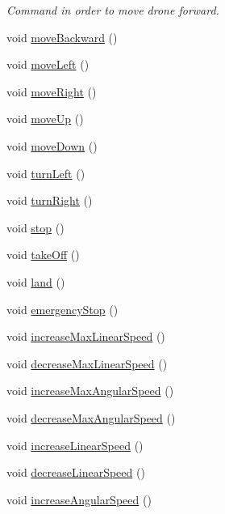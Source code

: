 \begin{DoxyCompactItemize}
\begin{DoxyCompactList}\small\item\em \-Command in order to move drone forward. \end{DoxyCompactList}\item 
void \hyperlink{classNymeria_a7781b8726f7a471265f86cd922440b12}{move\-Backward} ()
\item 
void \hyperlink{classNymeria_a95e1a46cb702df4244a3058de3c19812}{move\-Left} ()
\item 
void \hyperlink{classNymeria_a0cf0b3b960e66da1b3761d9df00bf08c}{move\-Right} ()
\item 
void \hyperlink{classNymeria_a33ad22560168d804fb4556bf22f37890}{move\-Up} ()
\item 
void \hyperlink{classNymeria_af317acf40210155d86a451d8498486bb}{move\-Down} ()
\item 
void \hyperlink{classNymeria_ac5ffdf4e6182fddfc5c082bc3e9c2cff}{turn\-Left} ()
\item 
void \hyperlink{classNymeria_a73bc4685c0de47b7a64c168218294765}{turn\-Right} ()
\item 
void \hyperlink{classNymeria_ac89e119ce6553bc25a104455159e7dcc}{stop} ()
\item 
void \hyperlink{classNymeria_ada86813f80111e1e8cec9cbd0e0d3edd}{take\-Off} ()
\item 
void \hyperlink{classNymeria_ac552d48476ba1999ce13461bed238bfb}{land} ()
\item 
void \hyperlink{classNymeria_a871d92e2206ca9ceb768b1bc35b83e8d}{emergency\-Stop} ()
\item 
void \hyperlink{classNymeria_af0bf1c66411d398b7ffed2ce05b6d521}{increase\-Max\-Linear\-Speed} ()
\item 
void \hyperlink{classNymeria_a3d7885e178ab495a79f4d7c6820b703a}{decrease\-Max\-Linear\-Speed} ()
\item 
void \hyperlink{classNymeria_abb97d909934b058ee3bf9d3e9090ad95}{increase\-Max\-Angular\-Speed} ()
\item 
void \hyperlink{classNymeria_a32c636fb95fcf32793f7632c4675b57c}{decrease\-Max\-Angular\-Speed} ()
\item 
void \hyperlink{classNymeria_a9fdb89e4e84a7ad566b7d0e1e06c17a0}{increase\-Linear\-Speed} ()
\item 
void \hyperlink{classNymeria_a08983812723252986961fb810eb875f4}{decrease\-Linear\-Speed} ()
\item 
void \hyperlink{classNymeria_ad96f2f3ef25a0d466e2866ee020d0d57}{increase\-Angular\-Speed} ()
\item 

\end{DoxyCompactItemize}
